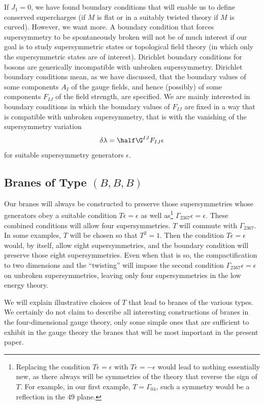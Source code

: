 If $J_1=0$, we have found boundary conditions that will enable us
to define conserved supercharges (if $M$ is flat or in a suitably
twisted theory if $M$ is curved).  However, we want more.  A
boundary condition that forces supersymmetry to be spontaneously
broken will not be of much interest if our goal is to study
supersymmetric states or topological field theory (in which only
the supersymmetric states are of interest). Dirichlet boundary
conditions for bosons are generically incompatible with unbroken
supersymmetry. Dirichlet boundary conditions mean, as we have
discussed, that the boundary values of some components $A_I$ of
the gauge fields, and hence (possibly) of some components $F_{IJ}$
of the field strength, are specified.  We are mainly interested in
boundary conditions in which the boundary values of $F_{IJ}$ are
fixed in a way that is compatible with unbroken supersymmetry,
that is with the vanishing of the supersymmetry variation
\setcounter{equation}{7}
\begin{equation}\label{eq:undop}
\delta\lambda =\half\G^{IJ}F_{IJ}\epsilon
\end{equation}
 for suitable
supersymmetry generators $\epsilon$.

\subsection{Branes of Type $(B,B,B)$}

Our branes will always be constructed to preserve those
supersymmetries whose generators obey a suitable condition
$T\epsilon=\epsilon$ as well as\footnote{Replacing the condition
$T\epsilon=\epsilon$ with $T\epsilon=-\epsilon$ would lead to
nothing essentially new, as there always will be symmetries of the
theory that reverse the sign of $T$.  For example, in our first
example, $T=\Gamma_{04}$, such a symmetry would be  a reflection
in the $49$ plane.} $\Gamma_{2367}\epsilon=\epsilon$.
 These combined
conditions will allow four supersymmetries. $T$ will commute with
$\Gamma_{2367}$. In some examples, $T$ will be chosen so that
$T^2=1$.  Then the condition $T\epsilon=\epsilon$ would, by
itself, allow eight supersymmetries, and the boundary condition
will preserve those eight supersymmetries.  Even when that is so,
the compactification to two dimensions and the ``twisting'' will
impose the second condition $\Gamma_{2367}\epsilon=\epsilon$ on
unbroken supersymmetries, leaving only four supersymmetries in the
low energy theory.

We will explain illustrative choices of $T$ that lead to branes of
the various types.  We certainly do not claim to describe all
interesting constructions of branes in the four-dimensional gauge
theory, only some simple ones that are sufficient to exhibit in
the gauge theory the branes that will be most important in the
present paper.

